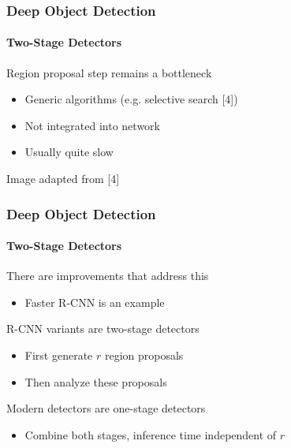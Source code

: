 \documentclass[xetex,professionalfont]{beamer}
\renewcommand\emph[1]{\textcolor{tuwcvl_cvl_blue}{#1}}
\newcommand{\eg}{\mbox{e.g.}\xspace} %
\begin{document}
\begin{frame}
	\frametitle{Deep Object Detection}
	\framesubtitle{Two-Stage Detectors}

	Region proposal step remains a bottleneck
	\begin{itemize}
		\item Generic algorithms (\eg selective search [4])
		\item Not integrated into network
		\item Usually quite slow
	\end{itemize}

	\medskip

	\begin{center}
		{\centering Image adapted from [4]}
	\end{center}

\end{frame}


\begin{frame}
	\frametitle{Deep Object Detection}
	\framesubtitle{Two-Stage Detectors}

	There are improvements that address this
	\begin{itemize}
		\item Faster R-CNN is an example
	\end{itemize}

	\bigskip
	R-CNN variants are \emph{two-stage detectors}
	\begin{itemize}
		\item First generate $r$ region proposals
		\item Then analyze these proposals
	\end{itemize}

	\bigskip
	Modern detectors are \emph{one-stage detectors}
	\begin{itemize}
		\item Combine both stages, inference time independent of $r$
	\end{itemize}

\end{frame}
\end{document}
